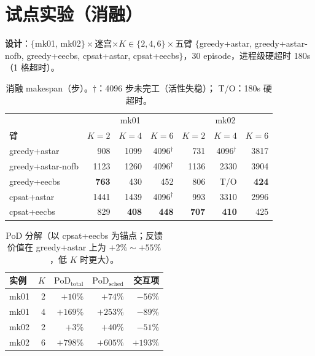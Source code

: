 \documentclass[UTF8,12pt,a4paper]{ctexart}
\begin{document}
\section{试点实验（消融）}\label{sec:pilot}

\textbf{设计}：$\{$mk01, mk02$\}\times$迷宫$\times K\in\{2,4,6\}\times$五臂
$\{$greedy+astar, greedy+astar-nofb, greedy+eecbs, cpsat+astar,
cpsat+eecbs$\}$，30 episode，进程级硬超时 180s（1 格超时）。

\begin{table}[h]
\centering
\begin{tabular}{lrrrrrr}
\toprule
 & \multicolumn{3}{c}{mk01} & \multicolumn{3}{c}{mk02} \\
臂 & $K{=}2$ & $K{=}4$ & $K{=}6$ & $K{=}2$ & $K{=}4$ & $K{=}6$ \\
\midrule
greedy+astar       & 908 & 1099 & 4096$^\dagger$ & 731 & 4096$^\dagger$ & 3817 \\
greedy+astar-nofb  & 1123 & 1260 & 4096$^\dagger$ & 1136 & 2330 & 3904 \\
greedy+eecbs       & \textbf{763} & 430 & 452 & 806 & T/O & \textbf{424} \\
cpsat+astar        & 1441 & 1439 & 4096$^\dagger$ & 993 & 3310 & 2996 \\
cpsat+eecbs        & 829 & \textbf{408} & \textbf{448} & \textbf{707} & \textbf{410} & 425 \\
\bottomrule
\end{tabular}
\caption{消融 makespan（步）。$\dagger$：4096 步未完工（活性失稳）；
T/O：180s 硬超时。}
\label{tab:decompmain}
\end{table}

\begin{table}[h]
\centering
\begin{tabular}{lrrrr}
\toprule
实例 & $K$ & $\mathrm{PoD}_{\mathrm{total}}$ & $\mathrm{PoD}_{\mathrm{sched}}$ & 交互项 \\
\midrule
mk01 & 2 & $+10\%$ & $+74\%$ & $-56\%$ \\
mk01 & 4 & $+169\%$ & $+253\%$ & $-89\%$ \\
mk02 & 2 & $+3\%$ & $+40\%$ & $-51\%$ \\
mk02 & 6 & $+798\%$ & $+605\%$ & $+193\%$ \\
\bottomrule
\end{tabular}
\caption{PoD 分解（以 cpsat+eecbs 为锚点；反馈价值在
greedy+astar 上为 $+2\%\sim+55\%$，低 $K$ 时更大）。}
\label{tab:pod}
\end{table}
\end{document}
